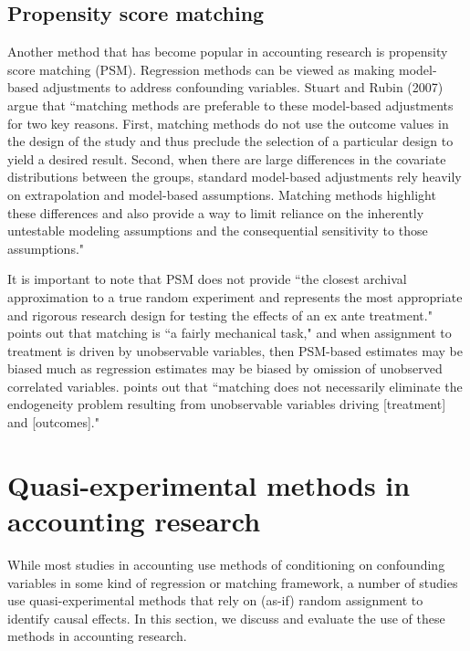 \documentclass[11pt,reqno]{amsart}
\begin{document}
\subsection{Propensity score matching}
Another method that has become popular in accounting research is propensity score matching (PSM).
Regression methods can be viewed as making model-based adjustments to address confounding variables.  
Stuart and Rubin (2007) argue that ``matching methods are preferable to these model-based adjustments for two key reasons. 
First, matching methods do not use the outcome values in the design of the study and thus preclude the selection of a particular design to yield a desired result.
Second, when there are large differences in the covariate distributions between the groups, standard model-based adjustments rely heavily on extrapolation and model-based assumptions.
Matching methods highlight these differences and also provide a way to limit reliance on the inherently untestable modeling assumptions and the consequential sensitivity to those assumptions."

It is important to note that PSM does not provide ``the closest archival approximation to a true random experiment and represents the most appropriate and rigorous research design for testing the effects of an ex ante treatment."
\citet[pp.\,73-75]{Rosenbaum:2009ul} points out that matching is ``a fairly mechanical  task," and when assignment to treatment is driven by unobservable variables, then PSM-based estimates may be biased much as regression estimates may be biased by omission of unobserved correlated variables.
\citep{MinuttiMeza:2014fn} points out that ``matching does not necessarily eliminate the endogeneity problem resulting from unobservable variables driving [treatment] and [outcomes]."




\section{Quasi-experimental methods in accounting research}

While most studies in accounting use methods of conditioning on confounding variables in some kind of regression or matching framework, a number of studies use quasi-experimental methods that rely on (as-if) random assignment to identify causal effects.
In this section, we discuss and evaluate the use of these methods in accounting research.
\end{document}
